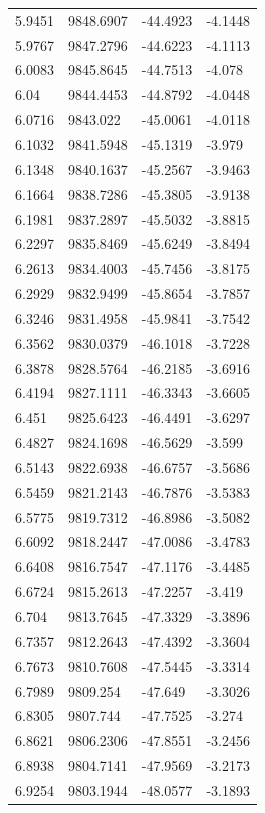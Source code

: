 \begin{table}[H]
\begin{tabular}{llll}
5.9451 & 9848.6907 & -44.4923 & -4.1448 \\
5.9767 & 9847.2796 & -44.6223 & -4.1113 \\
6.0083 & 9845.8645 & -44.7513 & -4.078 \\
6.04 & 9844.4453 & -44.8792 & -4.0448 \\
6.0716 & 9843.022 & -45.0061 & -4.0118 \\
6.1032 & 9841.5948 & -45.1319 & -3.979 \\
6.1348 & 9840.1637 & -45.2567 & -3.9463 \\
6.1664 & 9838.7286 & -45.3805 & -3.9138 \\
6.1981 & 9837.2897 & -45.5032 & -3.8815 \\
6.2297 & 9835.8469 & -45.6249 & -3.8494 \\
6.2613 & 9834.4003 & -45.7456 & -3.8175 \\
6.2929 & 9832.9499 & -45.8654 & -3.7857 \\
6.3246 & 9831.4958 & -45.9841 & -3.7542 \\
6.3562 & 9830.0379 & -46.1018 & -3.7228 \\
6.3878 & 9828.5764 & -46.2185 & -3.6916 \\
6.4194 & 9827.1111 & -46.3343 & -3.6605 \\
6.451 & 9825.6423 & -46.4491 & -3.6297 \\
6.4827 & 9824.1698 & -46.5629 & -3.599 \\
6.5143 & 9822.6938 & -46.6757 & -3.5686 \\
6.5459 & 9821.2143 & -46.7876 & -3.5383 \\
6.5775 & 9819.7312 & -46.8986 & -3.5082 \\
6.6092 & 9818.2447 & -47.0086 & -3.4783 \\
6.6408 & 9816.7547 & -47.1176 & -3.4485 \\
6.6724 & 9815.2613 & -47.2257 & -3.419 \\
6.704 & 9813.7645 & -47.3329 & -3.3896 \\
6.7357 & 9812.2643 & -47.4392 & -3.3604 \\
6.7673 & 9810.7608 & -47.5445 & -3.3314 \\
6.7989 & 9809.254 & -47.649 & -3.3026 \\
6.8305 & 9807.744 & -47.7525 & -3.274 \\
6.8621 & 9806.2306 & -47.8551 & -3.2456 \\
6.8938 & 9804.7141 & -47.9569 & -3.2173 \\
6.9254 & 9803.1944 & -48.0577 & -3.1893 \\

\end{tabular}
\end{table}
